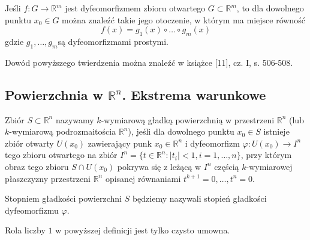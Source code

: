 \documentclass[leqno]{article}
\begin{document}
\begin{justify}
\begin{theorem}
{
    Jeśli $f : G \to \mathbb{R}^m$ jest dyfeomorfizmem zbioru otwartego $G \subset \mathbb{R}^m$, to dla dowolnego punktu $x_0 \in G$ 
    można znaleźć takie jego otoczenie, w którym ma miejsce równość
    \[
        f(x) = g_1(x) \circ \ldots \circ g_m(x)
    \]
    gdzie $g_1, \ldots, g_m$są dyfeomorfizmami prostymi.
}
\end{theorem}

Dowód powyższego twierdzenia można znaleźć w książce [11], cz. I, s. 506-508.

\subsection{Powierzchnia w $\mathbb{R}^n$. Ekstrema warunkowe}

\begin{defn}
    Zbiór $S \subset \mathbb{R}^n$ nazywamy $k$-wymiarową gładką powierzchnią w przestrzeni $\mathbb{R}^n$ (lub $k$-wymiarową podrozmaitościa $\mathbb{R}^n$),
    jeśli dla dowolnego punktu $x_0 \in S$ istnieje zbiór otwarty $U(x_0)$ zawierający punk $x_0 \in \mathbb{R}^n$ i dyfeomorfizm $\varphi : U(x_0) \to I^n$
    tego zbioru otwartego na zbiór $I^n = \{ t \in \mathbb{R}^n : |t_i| < 1, i = 1, \ldots, n\}$, przy którym obraz tego zbioru $S \cap U(x_0)$ pokrywa się
    z leżącą w $I^n$ częścią $k$-wymiarowej płaszczyzny przestrzeni $\mathbb{R}^n$ opisanej równaniami $t^{k+1} = 0, \ldots, t^n = 0$. 

    Stopniem gładkości powierzchni $S$ będziemy nazywali stopień gładkości dyfeomorfizmu $\varphi$.

    Rola liczby $1$ w powyższej definicji jest tylko czysto umowna. 
\end{defn}


\end{justify}
\end{document}
